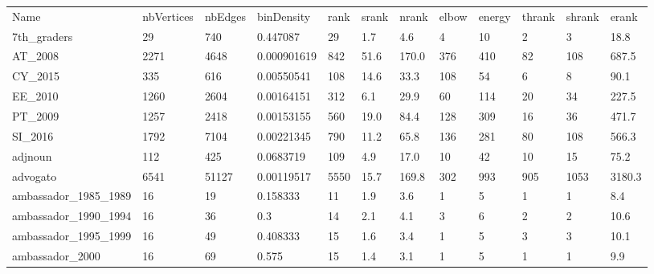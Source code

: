 \begin{longtable}{llllllllllll}
\hline
 Name                                               & nbVertices & nbEdges   & binDensity  & rank  & srank  & nrank  & elbow & energy & thrank & shrank & erank   \\
 7th\_graders                                        & 29         & 740       & 0.447087    & 29    & 1.7    & 4.6    & 4     & 10     & 2      & 3      & 18.8    \\
 AT\_2008                                            & 2271       & 4648      & 0.000901619 & 842   & 51.6   & 170.0  & 376   & 410    & 82     & 108    & 687.5   \\
 CY\_2015                                            & 335        & 616       & 0.00550541  & 108   & 14.6   & 33.3   & 108   & 54     & 6      & 8      & 90.1    \\
 EE\_2010                                            & 1260       & 2604      & 0.00164151  & 312   & 6.1    & 29.9   & 60    & 114    & 20     & 34     & 227.5   \\
 PT\_2009                                            & 1257       & 2418      & 0.00153155  & 560   & 19.0   & 84.4   & 128   & 309    & 16     & 36     & 471.7   \\
 SI\_2016                                            & 1792       & 7104      & 0.00221345  & 790   & 11.2   & 65.8   & 136   & 281    & 80     & 108    & 566.3   \\
 adjnoun                                            & 112        & 425       & 0.0683719   & 109   & 4.9    & 17.0   & 10    & 42     & 10     & 15     & 75.2    \\
 advogato                                           & 6541       & 51127     & 0.00119517  & 5550  & 15.7   & 169.8  & 302   & 993    & 905    & 1053   & 3180.3  \\
 ambassador\_1985\_1989                               & 16         & 19        & 0.158333    & 11    & 1.9    & 3.6    & 1     & 5      & 1      & 1      & 8.4     \\
 ambassador\_1990\_1994                               & 16         & 36        & 0.3         & 14    & 2.1    & 4.1    & 3     & 6      & 2      & 2      & 10.6    \\
 ambassador\_1995\_1999                               & 16         & 49        & 0.408333    & 15    & 1.6    & 3.4    & 1     & 5      & 3      & 3      & 10.1    \\
 ambassador\_2000                                    & 16         & 69        & 0.575       & 15    & 1.4    & 3.1    & 1     & 5      & 1      & 1      & 9.9     \\

\end{longtable}
